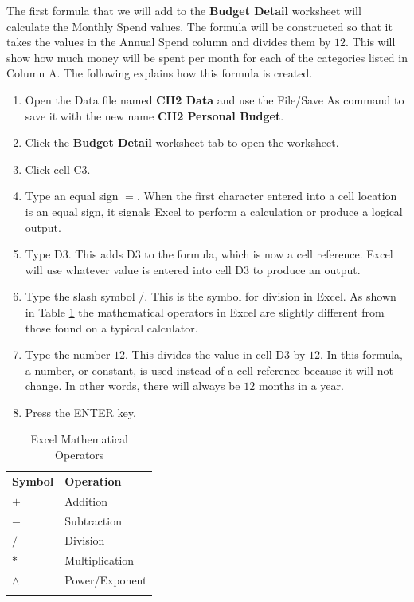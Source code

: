 The first formula that we will add to the \textbf{Budget Detail} worksheet will calculate the Monthly Spend values. The formula will be constructed so that it takes the values in the Annual Spend column and divides them by $ 12 $. This will show how much money will be spent per month for each of the categories listed in Column \textsf{A}. The following explains how this formula is created.

\begin{enumerate}
	\item Open the Data file named \textbf{CH2 Data} and use the File/Save As command to save it with the new name \textbf{CH2 Personal Budget}.
	\item Click the \textbf{Budget Detail} worksheet tab to open the worksheet.
	\item Click cell \textsf{C3}.
	\item Type an equal sign $ = $. When the first character entered into a cell location is an equal sign, it signals Excel to perform a calculation or produce a logical output.
	\item Type \textsf{D3}. This adds \textsf{D3} to the formula, which is now a cell reference. Excel will use whatever value is entered into cell \textsf{D3} to produce an output.
	\item Type the slash symbol $ / $. This is the symbol for division in Excel. As shown in Table \ref{02:tab02} the mathematical operators in Excel are slightly different from those found on a typical calculator.
	\item Type the number $ 12 $. This divides the value in cell \textsf{D3} by $ 12 $. In this formula, a number, or constant, is used instead of a cell reference because it will not change. In other words, there will always be $ 12 $ months in a year.
	\item Press the ENTER key.
\end{enumerate}

\begin{longtable}{p{0.85in}p{2.8in}}
	\textbf{Symbol} & \textbf{Operation} \endhead
	\hline \\
	$ + $ & Addition\\
	$ - $ & Subtraction\\
	$ / $ & Division\\
	$ * $ & Multiplication\\
	$ \wedge $ & Power/Exponent\\
	\hline
	\caption{Excel Mathematical Operators}
	\label{02:tab02}
\end{longtable}


